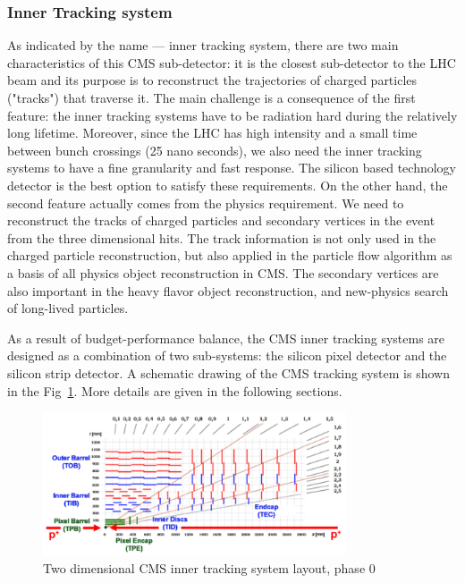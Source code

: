 \subsubsection{Inner Tracking system}

As indicated by the name --- inner tracking system, there are two main characteristics of this CMS sub-detector: it is the closest sub-detector to the LHC beam and its purpose is to reconstruct the trajectories of charged particles ("tracks") that traverse it. The main challenge is a consequence of the first feature: the inner tracking systems have to be radiation hard during the relatively long lifetime. Moreover, since the LHC has high intensity and a small time between bunch crossings (25 nano seconds), we also need the inner tracking systems to have a fine granularity and fast response. The silicon based technology detector is the best option to satisfy these requirements. On the other hand, the second feature actually comes from the physics requirement. We need to reconstruct the tracks of charged particles and secondary vertices in the event from the three dimensional hits. The track information is not only used in the charged particle reconstruction, but also applied in the particle flow algorithm\cite{CMS-PAS-PFT-09-001} as a basis of all physics object reconstruction in CMS. The secondary vertices are also important in the heavy flavor object reconstruction, and new-physics search of long-lived particles. 

As a result of budget-performance balance, the CMS inner tracking systems are designed as a combination of two sub-systems: the silicon pixel detector and the silicon strip detector. A schematic drawing of the CMS tracking system is shown in the Fig~\ref{fig:c3cms2dtracker}. More details are given in the following sections. 

\begin{figure}[htbp]
 \begin{center}
  \includegraphics[width=0.8\textwidth]{figures/c3/c3_cms_2dtracker.png}
 \end{center}
 \caption{Two dimensional CMS inner tracking system layout, phase 0}
 \label{fig:c3cms2dtracker}
\end{figure}

